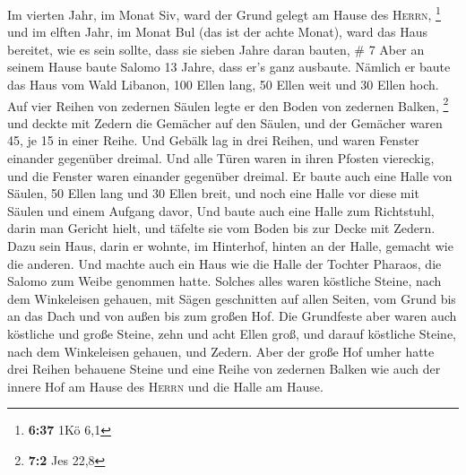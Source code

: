  Im vierten Jahr, im Monat Siv, ward der Grund gelegt am
Hause des \textsc{Herrn}, \footnote{\textbf{6:37} 1Kö 6,1}
 und im elften Jahr, im Monat Bul (das ist der achte
Monat), ward das Haus bereitet, wie es sein sollte, dass sie sieben
Jahre daran bauten, \# 7  Aber an seinem Hause baute
Salomo 13 Jahre, dass er's ganz ausbaute.  Nämlich er
baute das Haus vom Wald Libanon, 100 Ellen lang, 50 Ellen weit und 30
Ellen hoch. Auf vier Reihen von zedernen Säulen legte er den Boden von
zedernen Balken, \footnote{\textbf{7:2} Jes 22,8}  und
deckte mit Zedern die Gemächer auf den Säulen, und der Gemächer waren
45, je 15 in einer Reihe.  Und Gebälk lag in drei Reihen,
und waren Fenster einander gegenüber dreimal.  Und alle
Türen waren in ihren Pfosten viereckig, und die Fenster waren einander
gegenüber dreimal.  Er baute auch eine Halle von Säulen,
50 Ellen lang und 30 Ellen breit, und noch eine Halle vor diese mit
Säulen und einem Aufgang davor,  Und baute auch eine Halle
zum Richtstuhl, darin man Gericht hielt, und täfelte sie vom Boden bis
zur Decke mit Zedern.  Dazu sein Haus, darin er wohnte, im
Hinterhof, hinten an der Halle, gemacht wie die anderen. Und machte auch
ein Haus wie die Halle der Tochter Pharaos, die Salomo zum Weibe
genommen hatte.  Solches alles waren köstliche Steine,
nach dem Winkeleisen gehauen, mit Sägen geschnitten auf allen Seiten,
vom Grund bis an das Dach und von außen bis zum großen Hof.
 Die Grundfeste aber waren auch köstliche und große
Steine, zehn und acht Ellen groß,  und darauf köstliche
Steine, nach dem Winkeleisen gehauen, und Zedern.  Aber
der große Hof umher hatte drei Reihen behauene Steine und eine Reihe von
zedernen Balken wie auch der innere Hof am Hause des \textsc{Herrn} und
die Halle am Hause.

